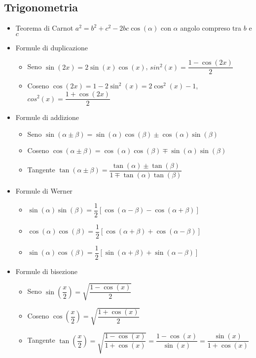 \documentclass{article}
\begin{document}
\subsection{Trigonometria}
\begin{itemize}
	\item Teorema di Carnot \( a^2 = b^2 + c^2 - 2bc\cos(\alpha)\) con \(\alpha\) angolo compreso tra \(b\) e \(c\)
	\item Formule di duplicazione
	      \begin{itemize}
		      \item Seno \(\sin(2x) = 2 \sin(x) \cos(x) \), \(sin^2(x) = \dfrac{1 - \cos(2x)}{2} \)
		      \item Coseno \( \cos(2x) = 1 - 2 \sin^2(x) = 2 \cos^2(x) - 1\), \(cos^2(x) = \dfrac{1 + \cos(2x)}{2} \)
	      \end{itemize}
	\item Formule di addizione
	      \begin{itemize}
		      \item Seno \( \sin(\alpha \pm \beta ) = \sin(\alpha)\cos(\beta) \pm \cos(\alpha)\sin(\beta)\)
		      \item Coseno \( \cos(\alpha \pm \beta ) = \cos(\alpha)\cos(\beta) \mp \sin(\alpha)\sin(\beta)\)
		      \item Tangente \(\tan(\alpha \pm \beta ) = \dfrac{\tan(\alpha) \pm \tan(\beta)}{1 \mp \tan(\alpha) \tan(\beta)} \)
	      \end{itemize}
	\item Formule di Werner
	      \begin{itemize}
		      \item \( \sin(\alpha) \sin(\beta) = \dfrac{1}{2} \left[ \cos(\alpha - \beta) - \cos(\alpha + \beta) \right] \)
		      \item \( \cos(\alpha) \cos(\beta) = \dfrac{1}{2} \left[ \cos(\alpha + \beta) + \cos(\alpha - \beta) \right] \)
		      \item \( \sin(\alpha) \cos(\beta) = \dfrac{1}{2} \left[ \sin(\alpha + \beta) + \sin(\alpha - \beta) \right] \)
	      \end{itemize}
	\item Formule di bisezione
	      \begin{itemize}
		      \item Seno \( \sin\left( \dfrac{x}{2} \right) = \sqrt{\dfrac{1 - \cos(x)}{2}} \)
		      \item Coseno  \( \cos\left( \dfrac{x}{2} \right) = \sqrt{\dfrac{1 + \cos(x)}{2}} \)
		      \item Tangente \( \tan\left( \dfrac{x}{2} \right) = \sqrt{\dfrac{1 - \cos(x)}{1 + \cos(x)}} = \dfrac{1 - \cos(x)}{\sin(x)} = \dfrac{\sin(x)}{1 + \cos(x)} \)

\end{itemize}
\end{itemize}
\end{document}
